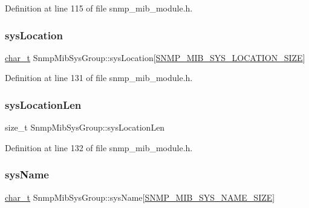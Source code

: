 Definition at line 115 of file snmp\+\_\+mib\+\_\+module.\+h.

\mbox{\label{structSnmpMibSysGroup_a5ee7cc159ea0df795ef7f811fae649da}} 
\subsubsection{\texorpdfstring{sys\+Location}{sysLocation}}
{\footnotesize\ttfamily \hyperlink{compiler__port_8h_a40bb5262bf908c328fbcfbe5d29d0201}{char\+\_\+t} Snmp\+Mib\+Sys\+Group\+::sys\+Location\mbox{[}\hyperlink{snmp__mib__module_8h_aaa419f0c2229fff5f62e5cbbaa59e48c}{S\+N\+M\+P\+\_\+\+M\+I\+B\+\_\+\+S\+Y\+S\+\_\+\+L\+O\+C\+A\+T\+I\+O\+N\+\_\+\+S\+I\+ZE}\mbox{]}}



Definition at line 131 of file snmp\+\_\+mib\+\_\+module.\+h.

\mbox{\label{structSnmpMibSysGroup_a4e627c50ec2d8b12defc2e50666765af}} 
\subsubsection{\texorpdfstring{sys\+Location\+Len}{sysLocationLen}}
{\footnotesize\ttfamily size\+\_\+t Snmp\+Mib\+Sys\+Group\+::sys\+Location\+Len}



Definition at line 132 of file snmp\+\_\+mib\+\_\+module.\+h.

\mbox{\label{structSnmpMibSysGroup_a83c68905155bdda8e434f6888187c023}} 
\subsubsection{\texorpdfstring{sys\+Name}{sysName}}
{\footnotesize\ttfamily \hyperlink{compiler__port_8h_a40bb5262bf908c328fbcfbe5d29d0201}{char\+\_\+t} Snmp\+Mib\+Sys\+Group\+::sys\+Name\mbox{[}\hyperlink{snmp__mib__module_8h_af0f58fc12e89fc76f8563540ddbcc82f}{S\+N\+M\+P\+\_\+\+M\+I\+B\+\_\+\+S\+Y\+S\+\_\+\+N\+A\+M\+E\+\_\+\+S\+I\+ZE}\mbox{]}}



